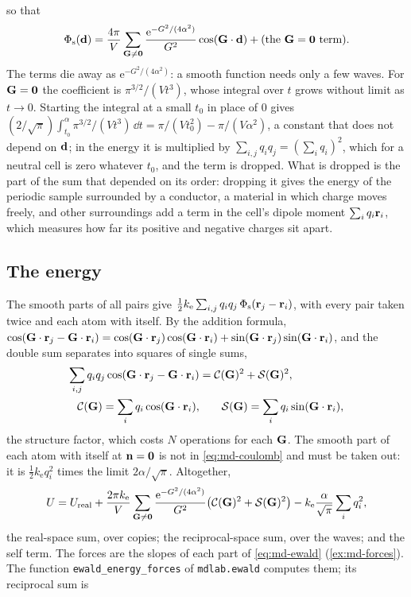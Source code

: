 so that
\begin{equation*}
   \Phi_{\mathrm s}(\bm{\mathrm{d}}) = \frac{4\pi}{V}\sum_{\bm{\mathrm{G}}\neq\bm{\mathrm{0}}}
   \frac{\mathrm{e}^{-G^2/(4\alpha^2)}}{G^2}\cos(\bm{\mathrm{G}}\cdot\bm{\mathrm{d}})
   + (\text{the }\bm{\mathrm{G}} = \bm{\mathrm{0}}\text{ term}) .
\end{equation*}
The terms die away as $\mathrm{e}^{-G^2/(4\alpha^2)}$: a smooth function
needs only a few waves. For $\bm{\mathrm{G}} = \bm{\mathrm{0}}$ the coefficient is
$\pi^{3/2}/(Vt^3)$, whose integral over $t$ grows without limit as $t \to
0$. Starting the integral at a small $t_0$ in place of 0 gives
$(2/\sqrt\pi)\int_{t_0}^{\alpha}\pi^{3/2}/(Vt^3)\,\dd t = \pi/(Vt_0^2) -
\pi/(V\alpha^2)$, a constant that does not depend on $\bm{\mathrm{d}}$; in the
energy it is multiplied by $\sum_{i,j}q_iq_j = (\sum_iq_i)^2$, which for a
neutral cell is zero whatever $t_0$, and the term is dropped. What is
dropped is the part of the sum that depended on its order: dropping it
gives the energy of the periodic sample surrounded by a conductor, a
material in which charge moves freely, and other surroundings add a term
in the cell's dipole moment $\sum_iq_i\bm{\mathrm{r}}_i$, which measures how far
its positive and negative charges sit apart\cite{deLeeuw1980}.

\subsection*{The energy}

The smooth parts of all pairs give $\frac12k_{\mathrm e}\sum_{i,j}q_iq_j
\,\Phi_{\mathrm s}(\bm{\mathrm{r}}_j - \bm{\mathrm{r}}_i)$, with every pair taken twice and
each atom with itself. By the addition formula, $\cos(\bm{\mathrm{G}}\cdot\bm{\mathrm{r}}_j
- \bm{\mathrm{G}}\cdot\bm{\mathrm{r}}_i) = \cos(\bm{\mathrm{G}}\cdot\bm{\mathrm{r}}_j)\cos(\bm{\mathrm{G}}\cdot
\bm{\mathrm{r}}_i) + \sin(\bm{\mathrm{G}}\cdot\bm{\mathrm{r}}_j)\sin(\bm{\mathrm{G}}\cdot\bm{\mathrm{r}}_i)$, and the
double sum separates into squares of single sums,
\begin{align*}
   \sum_{i,j}q_iq_j\cos(\bm{\mathrm{G}}\cdot\bm{\mathrm{r}}_j - \bm{\mathrm{G}}\cdot\bm{\mathrm{r}}_i)
   &= \mathcal{C}(\bm{\mathrm{G}})^2 + \mathcal{S}(\bm{\mathrm{G}})^2 ,\\
   \mathcal{C}(\bm{\mathrm{G}}) = \sum_iq_i\cos(\bm{\mathrm{G}}\cdot\bm{\mathrm{r}}_i) ,
   &\qquad \mathcal{S}(\bm{\mathrm{G}}) = \sum_iq_i\sin(\bm{\mathrm{G}}\cdot\bm{\mathrm{r}}_i) ,
\end{align*}
the structure factor, which costs $N$ operations for each $\bm{\mathrm{G}}$. The
smooth part of each atom with itself at $\bm{\mathrm{n}} = \bm{\mathrm{0}}$ is not in
\cref{eq:md-coulomb} and must be taken out: it is $\frac12k_{\mathrm e}
q_i^2$ times the limit $2\alpha/\sqrt\pi$. Altogether,
\begin{equation}
   U = U_{\mathrm{real}}
   + \frac{2\pi k_{\mathrm e}}{V}\sum_{\bm{\mathrm{G}}\neq\bm{\mathrm{0}}}
   \frac{\mathrm{e}^{-G^2/(4\alpha^2)}}{G^2}\bigl(\mathcal{C}(\bm{\mathrm{G}})^2
   + \mathcal{S}(\bm{\mathrm{G}})^2\bigr)
   - k_{\mathrm e}\frac{\alpha}{\sqrt\pi}\sum_iq_i^2 ,
   \label{eq:md-ewald}
\end{equation}
the real-space sum, over copies; the reciprocal-space sum, over the
waves; and the self term. The forces are the slopes of each part of
\cref{eq:md-ewald} (\cref{ex:md-forces}). The function
\texttt{ewald\_energy\_forces} of \texttt{mdlab.ewald} computes them; its
reciprocal sum is

